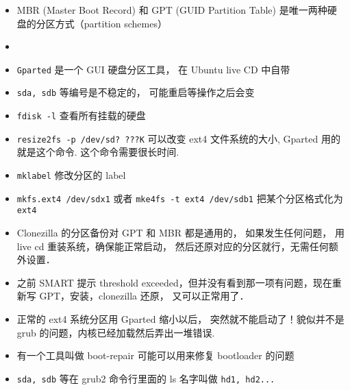 
\begin{issues}
\issueDraft
\end{issues}

\begin{itemize}
\item MBR (Master Boot Record) 和 GPT (GUID Partition Table) 是唯一两种硬盘的分区方式（partition schemes）
\item 
\item \verb|Gparted| 是一个 GUI 硬盘分区工具， 在 Ubuntu live CD 中自带
\item \verb|sda, sdb| 等编号是不稳定的， 可能重启等操作之后会变
\item \verb|fdisk -l| 查看所有挂载的硬盘
\item \verb|resize2fs -p /dev/sd? ???K| 可以改变 ext4 文件系统的大小, Gparted 用的就是这个命令. 这个命令需要很长时间.
\item \verb|mklabel| 修改分区的 label
\item \verb|mkfs.ext4 /dev/sdx1| 或者 \verb|mke4fs -t ext4 /dev/sdb1| 把某个分区格式化为 \verb|ext4|
\item Clonezilla 的分区备份对 GPT 和 MBR 都是通用的， 如果发生任何问题， 用 live cd 重装系统，确保能正常启动， 然后还原对应的分区就行，无需任何额外设置．
\item 之前 SMART 提示 threshold exceeded，但并没有看到那一项有问题，现在重新写 GPT，安装，clonezilla 还原， 又可以正常用了．
\item  正常的 ext4 系统分区用 Gparted 缩小以后， 突然就不能启动了！貌似并不是 grub 的问题，内核已经加载然后弄出一堆错误.
\item 有一个工具叫做 boot-repair 可能可以用来修复 bootloader 的问题
\item \verb|sda, sdb| 等在 grub2 命令行里面的 ls 名字叫做 \verb|hd1, hd2...|
\end{itemize}
